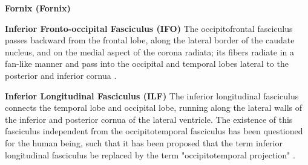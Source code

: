\documentclass[../structure.tex]{subfiles}
\begin{document}
		\textbf{Fornix (Fornix)}
		\begin{comment}
		The fornix (Latin, "vault" or "arch") is a C-shaped bundle of fibers (axons) in the brain, and carries signals from the hippocampus to the hypothalamus.
The fibres begin in the hippocampus on each side of the brain (where they are also known as the fimbria); the separate left and right sides are each called the crus of the fornix. The bundles of fibres come together in the midline of the brain, forming the body of the fornix. The inferior edge of the septum pellucidum (a membrane that separates the two lateral ventricles) is attached to the upper face of the fornix body.
The body of the fornix travels anteriorly and divides again near the anterior commissure. The left and right parts separate, but there is also an anterior/posterior divergence.
The posterior fibres (called the postcommissural fornix) of each side continue through the hypothalamus to the mammillary bodies; then to the anterior nuclei of thalamus, which project to the cingulate cortex.
The anterior fibers (precommissural fornix) end at the septal nuclei and nucleus accumbens of each half of the brain \cite{PDD2015}.

		While its exact function and importance in the physiology of the brain are still not entirely clear, it has been demonstrated that surgical transection – the cutting of the fornix along its body – can cause memory loss \cite{HenryGray1918}. There is some debate over what type of memory is affected by this damage, but it has been found to most closely correlate with recall memory rather than recognition memory. This means that damage to the fornix can cause difficulty in recalling long-term information such as details of past events, but it has little effect on the ability to recognize objects or familiar situations \cite{HenryGray1918}.
		\end{comment}
		\textbf{Inferior Fronto-occipital Fasciculus (IFO)}
		The occipitofrontal fasciculus passes backward from the frontal lobe, along the lateral border of the caudate nucleus, and on the medial aspect of the corona radiata; its fibers radiate in a fan-like manner and pass into the occipital and temporal lobes lateral to the posterior and inferior cornua \cite{PDD2015}.
		
		\textbf{Inferior Longitudinal Fasciculus (ILF)}
		The inferior longitudinal fasciculus connects the temporal lobe and occipital lobe, running along the lateral walls of the inferior and posterior cornua of the lateral ventricle.
The existence of this fasciculus independent from the occipitotemporal fasciculus has been questioned for the human being, such that it has been proposed that the term inferior longitudinal fasciculus be replaced by the term "occipitotemporal projection" \cite{PDD2015}.
\end{document}
